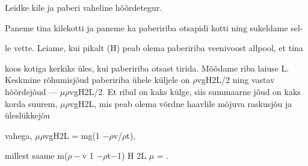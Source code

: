 
Leidke kile ja paberi vaheline hõõrdetegur.

\hint

\solu
Paneme tina kilekotti ja paneme ka pabeririba otsapidi kotti ning sukeldame sel-

le vette. Leiame, kui pikalt (H) peab olema pabeririba veenivoost allpool, et tina

koos kotiga kerkiks üles, kui pabeririba otsast tirida. Mõõdame riba laiuse L. Keskmine rõhumisjõud pabeririba ühele küljele on $\rho$vgH2L/2 ning vastav hõõrdejõud --- $\mu\rho$vgH2L/2. Et ribal on kaks külge, siis summaarne jõud on kaks korda suurem, $\mu\rho$vgH2L, mis peab olema võrdne haavlile mõjuva raskusjõu ja üleslükkejõu

vahega, $\mu\rho$vgH2L = mg(1 $- \rho$v/$\rho$t),

millest saame m($\rho-$v 1 $- \rho$t$-$1) H 2L $\mu$ = .
\probend
